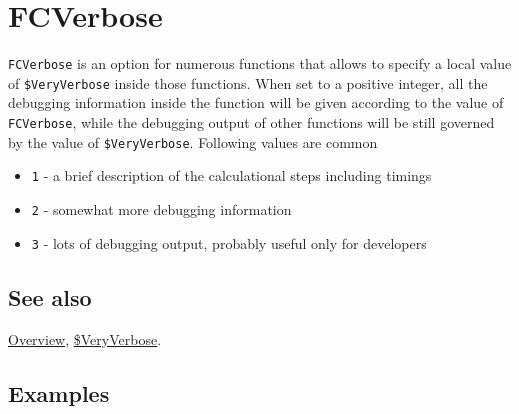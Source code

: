 \documentclass[../FeynCalcManual.tex]{subfiles}
\begin{document}
\hypertarget{fcverbose}{
\section{FCVerbose}\label{fcverbose}}

\texttt{FCVerbose} is an option for numerous functions that allows to
specify a local value of \texttt{\$VeryVerbose} inside those functions.
When set to a positive integer, all the debugging information inside the
function will be given according to the value of \texttt{FCVerbose},
while the debugging output of other functions will be still governed by
the value of \texttt{\$VeryVerbose}. Following values are common

\begin{itemize}
\item
  \texttt{1} - a brief description of the calculational steps including
  timings
\item
  \texttt{2} - somewhat more debugging information
\item
  \texttt{3} - lots of debugging output, probably useful only for
  developers
\end{itemize}

\subsection{See also}

\hyperlink{toc}{Overview}, \hyperlink{dollarveryverbose}{\$VeryVerbose}.

\subsection{Examples}

\begin{Shaded}
\begin{Highlighting}[]
\OperatorTok{[}\OperatorTok{[}\SpecialCharTok{\textbackslash{}}\OperatorTok{[}\OperatorTok{],} \SpecialCharTok{\textbackslash{}}\OperatorTok{[}\OperatorTok{],} \SpecialCharTok{\textbackslash{}}\OperatorTok{[}\OperatorTok{],} \SpecialCharTok{\textbackslash{}}\OperatorTok{[}\OperatorTok{],} \SpecialCharTok{\textbackslash{}}\OperatorTok{[}\OperatorTok{]],}\OtherTok{{-}\textgreater{}} \OperatorTok{]}
\end{Highlighting}
\end{Shaded}
\end{document}
